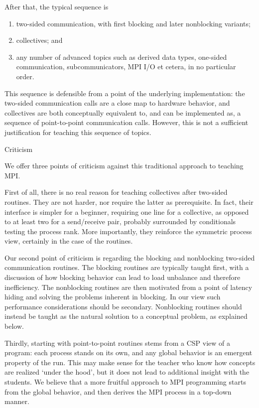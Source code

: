 After that, the typical sequence is
\begin{enumerate}
\item two-sided communication, with first blocking and later nonblocking variants;
\item collectives; and 
\item any number of advanced topics such as derived data types,
  one-sided communication, subcommunicators,
  MPI I/O et cetera, in no particular order.
\end{enumerate}
This sequence is defensible from a point of the underlying implementation:
the two-sided communication calls are a close map to hardware behavior,
and collectives are both conceptually equivalent to, and
can be implemented as, a sequence of point-to-point communication calls.
However, this is not a sufficient justification for
teaching this sequence of topics.

 {Criticism}

We offer three points of criticism against this traditional approach to teaching MPI.

First of all, there is
no real reason for teaching collectives after two-sided routines. They
are not harder, nor require the latter as prerequisite. In fact, their
interface is simpler for a beginner, requiring one line for a collective, as
opposed to at least two for a send/receive pair, probably surrounded
by conditionals testing the process rank. More importantly, they
reinforce the symmetric process view, certainly in the case of the
 routines.

Our second point of criticism is regarding the blocking and
nonblocking two-sided communication routines.
%
The blocking routines are typically taught
first, with a discussion of how blocking behavior can lead to load
unbalance and therefore inefficiency. The nonblocking routines are
then motivated from a point of latency hiding and solving the problems
inherent in blocking. In our view such performance considerations
should be secondary.
Nonblocking routines should instead be taught as the natural solution to a
conceptual problem, as explained below.

Thirdly, starting with point-to-point routines stems from a
\ac{CSP}\cite{Hoare:CSP} view of a program:
each process stands on its own, and any global behavior is an emergent
property of the run. This may make sense for the teacher who know
how concepts are realized `under the hood', but it does not lead
to additional insight with the students.
We believe that a more fruitful approach to MPI
programming starts from the global behavior, and then derives the MPI
process in a top-down manner.

